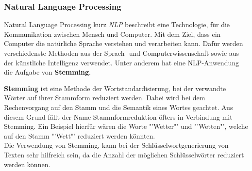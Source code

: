 		\subsubsection{Natural Language Processing}
			Natural Language Processing kurz \textit{NLP} beschreibt eine Technologie, für die Kommunikation zwischen Mensch und Computer. Mit dem Ziel, dass ein Computer die natürliche Sprache verstehen und verarbeiten kann. Dafür werden verschiedenste Methoden aus der Sprach- und Computerwissenschaft sowie aus der künstliche Intelligenz verwendet. Unter anderem hat eine NLP-Anwendung die Aufgabe von \textbf{Stemming}.\cite{NLP} 
	
			\textbf{Stemming} ist eine Methode der Wortstandardisierung, bei der verwandte Wörter auf ihrer Stammform reduziert werden. Dabei wird bei dem Rechenvorgang auf den Stamm und die Semantik eines Wortes geachtet. Aus diesem Grund fällt der Name Stammformreduktion öfters in Verbindung mit Stemming.\cite{eldesouki2009stemming} Ein Beispiel hierfür wären die Worte "'Wetter"' und "'Wetten"', welche auf den Stamm "'Wett"' reduziert werden könnten. \cite{philippmulti}\\ 
			Die Verwendung von Stemming, kann bei der Schlüsselwortgenerierung von Texten sehr hilfreich sein, da die Anzahl der möglichen Schlüsselwörter reduziert werden können.


